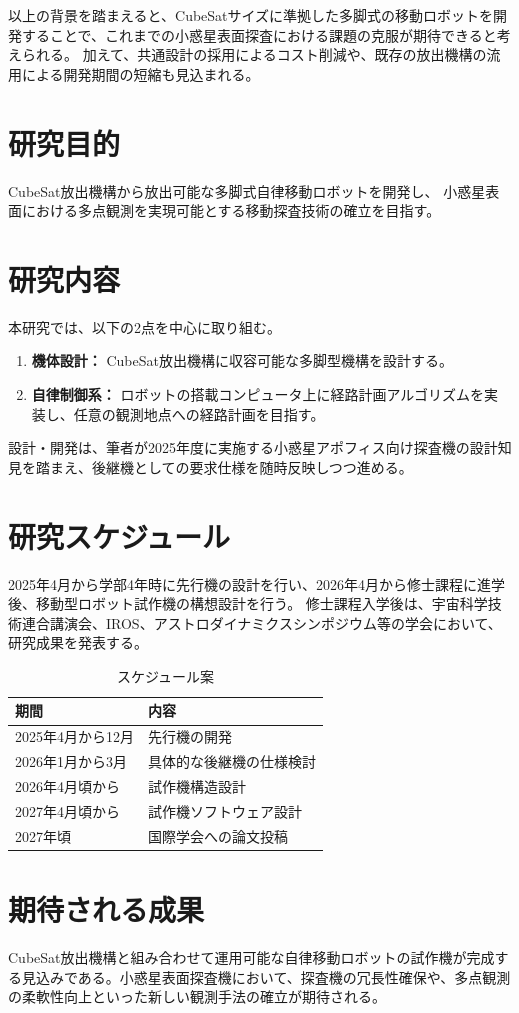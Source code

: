 \documentclass[dvipdfmx,titlepage,a4j]{jsarticle}
\begin{document}
以上の背景を踏まえると、CubeSatサイズに準拠した多脚式の移動ロボットを開発することで、これまでの小惑星表面探査における課題の克服が期待できると考えられる。
加えて、共通設計の採用によるコスト削減や、既存の放出機構の流用による開発期間の短縮も見込まれる。

\section{研究目的}
CubeSat放出機構から放出可能な多脚式自律移動ロボットを開発し、
小惑星表面における多点観測を実現可能とする移動探査技術の確立を目指す。

\section{研究内容}
本研究では、以下の2点を中心に取り組む。

\begin{enumerate}
    \item \textbf{機体設計：}
          CubeSat放出機構に収容可能な多脚型機構を設計する。
    \item \textbf{自律制御系：}
          ロボットの搭載コンピュータ上に経路計画アルゴリズムを実装し、任意の観測地点への経路計画を目指す。
\end{enumerate}

設計・開発は、筆者が2025年度に実施する小惑星アポフィス向け探査機の設計知見を踏まえ、後継機としての要求仕様を随時反映しつつ進める。


\section{研究スケジュール}
2025年4月から学部4年時に先行機の設計を行い、2026年4月から修士課程に進学後、移動型ロボット試作機の構想設計を行う。
修士課程入学後は、宇宙科学技術連合講演会、IROS、アストロダイナミクスシンポジウム等の学会において、研究成果を発表する。

\begin{table}[H]
    \centering
    \caption{スケジュール案}
    \begin{tabular}{l|l}
        \hline
        期間           & 内容           \\
        \hline \hline
        2025年4月から12月 & 先行機の開発       \\
        \hline
        2026年1月から3月  & 具体的な後継機の仕様検討 \\
        \hline
        2026年4月頃から   & 試作機構造設計      \\
        \hline
        2027年4月頃から   & 試作機ソフトウェア設計  \\
        \hline
        2027年頃       & 国際学会への論文投稿   \\
        \hline
    \end{tabular}
    \label{tab:schedule}
\end{table}

\section{期待される成果}
CubeSat放出機構と組み合わせて運用可能な自律移動ロボットの試作機が完成する見込みである。小惑星表面探査機において、探査機の冗長性確保や、多点観測の柔軟性向上といった新しい観測手法の確立が期待される。

\newpage

\nocite{*}


\end{document}
